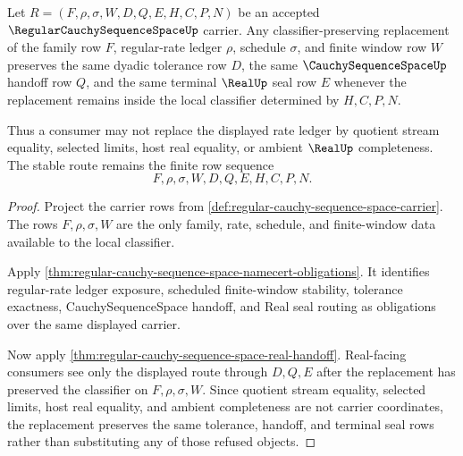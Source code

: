\begin{theorem}
\label{thm:regular-cauchy-sequence-space-rate-ledger-stability}
Let $R=(F,\rho,\sigma,W,D,Q,E,H,C,P,N)$ be an accepted $\RegularCauchySequenceSpaceUp$ carrier. Any classifier-preserving replacement of the family row $F$, regular-rate ledger $\rho$, schedule $\sigma$, and finite window row $W$ preserves the same dyadic tolerance row $D$, the same $\CauchySequenceSpaceUp$ handoff row $Q$, and the same terminal $\RealUp$ seal row $E$ whenever the replacement remains inside the local classifier determined by $H,C,P,N$.

Thus a consumer may not replace the displayed rate ledger by quotient stream equality, selected limits, host real equality, or ambient $\RealUp$ completeness. The stable route remains the finite row sequence
$$
F,\rho,\sigma,W,D,Q,E,H,C,P,N.
$$
\end{theorem}
\begin{proof}
Project the carrier rows from \autoref{def:regular-cauchy-sequence-space-carrier}. The rows $F,\rho,\sigma,W$ are the only family, rate, schedule, and finite-window data available to the local classifier.

Apply \autoref{thm:regular-cauchy-sequence-space-namecert-obligations}. It identifies regular-rate ledger exposure, scheduled finite-window stability, tolerance exactness, CauchySequenceSpace handoff, and Real seal routing as obligations over the same displayed carrier.

Now apply \autoref{thm:regular-cauchy-sequence-space-real-handoff}. Real-facing consumers see only the displayed route through $D,Q,E$ after the replacement has preserved the classifier on $F,\rho,\sigma,W$. Since quotient stream equality, selected limits, host real equality, and ambient completeness are not carrier coordinates, the replacement preserves the same tolerance, handoff, and terminal seal rows rather than substituting any of those refused objects.
\end{proof}

